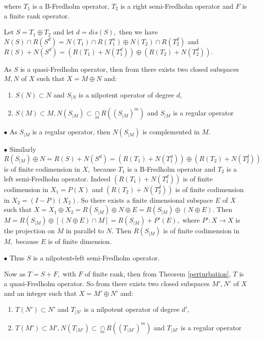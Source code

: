 \documentclass[10pt]{article}
\numberwithin{equation}{section}
\begin{document}
where  $T_1$ is a  B-Fredholm operator, $T_2$ is a right semi-Fredholm operator and  $F$ is a finite rank operator.

Let $S= T_1 \oplus T_2$ and let $d=dis(S),$ then  we have $ N(S)\cap R(S^d)= N(T_1)\cap R(T_1^n) \oplus N(T_2)\cap R(T_2^d)$ and   $ R(S)+ N(S^d)= (R(T_1)+ N(T_1^d)) \oplus (R(T_2)+ N(T_2^d)).$ 

As $S$ is a quasi-Fredholm operator, then from  \cite[Th\'eor\`eme 3.2.2]{LAB}   there exists two closed
subspaces  $M,  N$  of $ X $  such that   $ X = M\oplus N $  and:

\begin{enumerate}
\item $S(N)\subset N $  and  $ S_{\mid N}$ is a  nilpotent operator of degree $d$,
\item $ S(M) \subset M, 
N(S_{\mid M })  \subset \underset{m} \cap R( (S_{\mid M })^m)  $  and $S_{\mid M }$ is a regular operator
\end{enumerate}

$\bullet$ As $S_{\mid M }$ is a regular operator, then  $N(S_{\mid M })$ is complemented in $M.$ 


$\bullet$ Similarly  $R(S_{\mid M }) \oplus N=  R(S)+ N(S^d)= (R(T_1)+ N(T_1^d)) \oplus (R(T_2)+ N(T_2^d))$ is of finite codimension in $X,$  because $T_1$ is a B-Fredholm operator and $T_2$ is a left semi-Fredholm operator. Indeed $ (R(T_1)+ N(T_1^d))$ is of finite codimension in $ X_1=P(X)$ and $(R(T_2)+ N(T_2^d))$ is of finite codimension in $X_2=(I-P)(X_2).$
So there exists a finite dimensional  subspace $E$ of $X$ such that  $ X= X_1 \oplus X_2= R(S_{\mid M }) \oplus N \oplus E= R(S_{\mid M }) \oplus (N \oplus E) .$  Then  $ M= R(S_{\mid M }) \oplus [(N \oplus E)\cap M]= R(S_{\mid M }) + P'(E), $ where $ P': X \rightarrow X$ is the projection on $M$ in parallel to $N.$   Then  $R(S_{\mid M })$ is of finite codimension  in $M,$  because $E$ 
is of finite dimension.



$\bullet$ Thus $S$ is a nilpotent\textbf{\Large-}left semi-Fredholm operator. 

Now as $ T= S+ F,$ with $F$ of finite rank, then from Theorem \ref{perturbation}, $ T$ is a quasi-Fredholm operator. So from  \cite[Th\'eor\'eme 3.2.2]{LAB}   there exists two closed
subspaces  $M',  N'$  of $ X $ and an integer  such that   $ X = M'\oplus N' $  and:

\begin{enumerate}
\item $T(N')\subset N' $  and  $ T_{\mid N'}$ is a  nilpotent operator of degree $d'$,
\item $ T(M') \subset M',  
 N(T_{\mid M' })  \subset \underset{m} \cap R( (T_{\mid M' })^m)  $ and $T_{\mid M' }$ is a regular operator
\end{enumerate}
\end{document}
